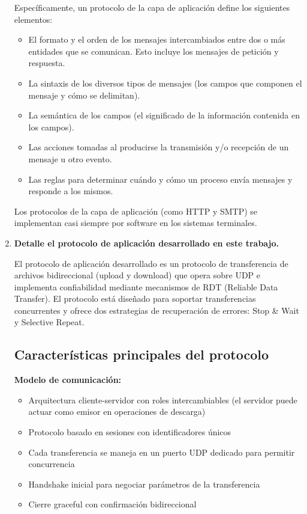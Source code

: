 \begin{enumerate}
    Específicamente, un protocolo de la capa de aplicación define los siguientes elementos:
    \begin{itemize}
        \item El formato y el orden de los mensajes intercambiados entre dos o más entidades que se comunican. Esto incluye los mensajes de petición y respuesta.
        \item La sintaxis de los diversos tipos de mensajes (los campos que componen el mensaje y cómo se delimitan).
        \item La semántica de los campos (el significado de la información contenida en los campos).
        \item Las acciones tomadas al producirse la transmisión y/o recepción de un mensaje u otro evento.
        \item Las reglas para determinar cuándo y cómo un proceso envía mensajes y responde a los mismos.
    \end{itemize}

    Los protocolos de la capa de aplicación (como HTTP y SMTP) se implementan casi siempre por software en los sistemas terminales.

    \item \textbf{Detalle el protocolo de aplicación desarrollado en este trabajo.}
    
    El protocolo de aplicación desarrollado es un protocolo de transferencia de archivos bidireccional (upload y download) que opera sobre UDP e implementa confiabilidad mediante mecanismos de RDT (Reliable Data Transfer). El protocolo está diseñado para soportar transferencias concurrentes y ofrece dos estrategias de recuperación de errores: Stop \& Wait y Selective Repeat.
    
    \subsection*{Características principales del protocolo}
    
    \textbf{Modelo de comunicación:}
    \begin{itemize}
        \item Arquitectura cliente-servidor con roles intercambiables (el servidor puede actuar como emisor en operaciones de descarga)
        \item Protocolo basado en sesiones con identificadores únicos
        \item Cada transferencia se maneja en un puerto UDP dedicado para permitir concurrencia
        \item Handshake inicial para negociar parámetros de la transferencia
        \item Cierre graceful con confirmación bidireccional
    \end{itemize}
    

\end{enumerate}
